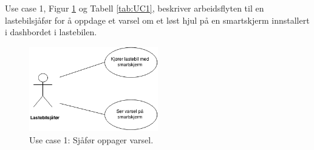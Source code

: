 Use case 1, Figur \ref{fig:UC1} og Tabell \ref{tab:UC1}, beskriver arbeidsflyten til en 
lastebilsjåfør for å oppdage et varsel om et løst hjul på en 
smartskjerm innstallert i dashbordet i lastebilen.
\newline
\begin{figure}[H]
	\centering
	\includegraphics[width=0.50\textwidth]{images/UC1.png}
	\caption{Use case 1: Sjåfør oppager varsel.}
	\label{fig:UC1}
\end{figure}

